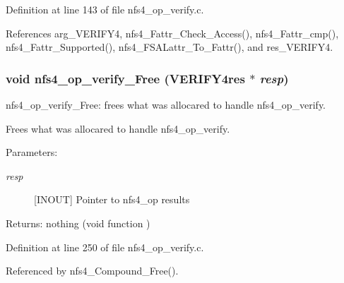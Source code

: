 Definition at line 143 of file nfs4\_\-op\_\-verify.c.

References arg\_\-VERIFY4, nfs4\_\-Fattr\_\-Check\_\-Access(), nfs4\_\-Fattr\_\-cmp(), nfs4\_\-Fattr\_\-Supported(), nfs4\_\-FSALattr\_\-To\_\-Fattr(), and res\_\-VERIFY4.
\subsubsection{\setlength{\rightskip}{0pt plus 5cm}void nfs4\_\-op\_\-verify\_\-Free (VERIFY4res $\ast$ {\em resp})}\label{nfs4__op__verify_8c_a3}


nfs4\_\-op\_\-verify\_\-Free: frees what was allocared to handle nfs4\_\-op\_\-verify.

Frees what was allocared to handle nfs4\_\-op\_\-verify.

\begin{Desc}
\item[Parameters:]
\begin{description}
\item[{\em resp}][INOUT] Pointer to nfs4\_\-op results\end{description}
\end{Desc}
\begin{Desc}
\item[Returns:]nothing (void function ) \end{Desc}


Definition at line 250 of file nfs4\_\-op\_\-verify.c.

Referenced by nfs4\_\-Compound\_\-Free().